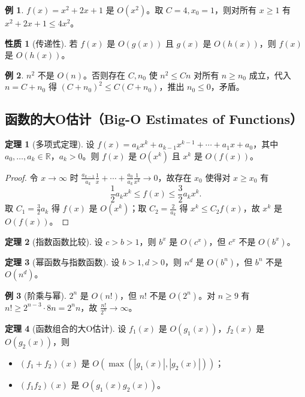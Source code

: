 \documentclass[UTF8,11pt,a4paper]{ctexbook}   %
\theoremstyle{definition}
\newtheorem{theorem}{定理}[section]
\newtheorem{example}{例}[section]
\newtheorem{property}{性质}[section]
\begin{document}
\begin{example}
$f(x)=x^2+2x+1$ 是 $O(x^2)$。取 $C=4, x_0=1$，则对所有 $x \geq 1$ 有 $x^2+2x+1 \leq 4x^2$。
\end{example}

\begin{property}[传递性]
若 $f(x)$ 是 $O(g(x))$ 且 $g(x)$ 是 $O(h(x))$，则 $f(x)$ 是 $O(h(x))$。
\end{property}

\begin{example}
$n^2$ 不是 $O(n)$。否则存在 $C,n_0$ 使 $n^2 \leq Cn$ 对所有 $n \geq n_0$ 成立，代入 $n=C+n_0$ 得 $(C+n_0)^2 \leq C(C+n_0)$，推出 $n_0 \leq 0$，矛盾。
\end{example}

\subsection{函数的大O估计（Big-O Estimates of Functions）}

\begin{theorem}[多项式定理]
设 $f(x)=a_k x^k + a_{k-1} x^{k-1} + \cdots + a_1 x + a_0$，其中 $a_0,\dots,a_k \in \mathbb{R}$，$a_k > 0$。则 $f(x)$ 是 $O(x^k)$ 且 $x^k$ 是 $O(f(x))$。
\end{theorem}

\begin{proof}
令 $x \to \infty$ 时 $\frac{a_{k-1}}{a_k}\frac1x + \cdots + \frac{a_0}{a_k}\frac1{x^k} \to 0$，故存在 $x_0$ 使得对 $x \geq x_0$ 有
\[
\frac12 a_k x^k \leq f(x) \leq \frac32 a_k x^k.
\]
取 $C_1 = \frac32 a_k$ 得 $f(x)$ 是 $O(x^k)$；取 $C_2 = \frac{2}{a_k}$ 得 $x^k \leq C_2 f(x)$，故 $x^k$ 是 $O(f(x))$。
\end{proof}

\begin{theorem}[指数函数比较]
设 $c > b > 1$，则 $b^x$ 是 $O(c^x)$，但 $c^x$ 不是 $O(b^x)$。
\end{theorem}

\begin{theorem}[幂函数与指数函数]
设 $b > 1, d > 0$，则 $n^d$ 是 $O(b^n)$，但 $b^n$ 不是 $O(n^d)$。
\end{theorem}

\begin{example}[阶乘与幂]
$2^n$ 是 $O(n!)$，但 $n!$ 不是 $O(2^n)$。对 $n \geq 9$ 有 $n! \geq 2^{n-3} \cdot 8n = 2^n n$，故 $\frac{n!}{2^n} \to \infty$。
\end{example}

\begin{theorem}[函数组合的大O估计]
设 $f_1(x)$ 是 $O(g_1(x))$，$f_2(x)$ 是 $O(g_2(x))$，则
\begin{itemize}
    \item $(f_1+f_2)(x)$ 是 $O(\max(|g_1(x)|, |g_2(x)|))$；
    \item $(f_1 f_2)(x)$ 是 $O(g_1(x) g_2(x))$。
\end{itemize}
\end{theorem}
\end{document}
